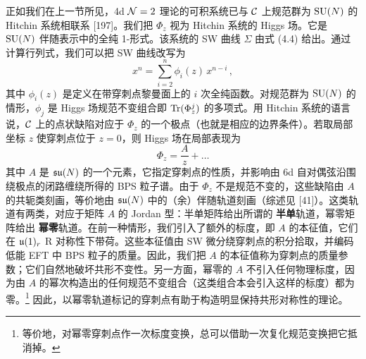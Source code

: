 正如我们在上一节所见，4d $\mathcal{N}=2$ 理论的可积系统已与 $\mathcal{C}$ 上规范群为 $\mathrm{SU}(N)$ 的 Hitchin 系统相联系 [197]。我们把 $\Phi_z$ 视为 Hitchin 系统的 Higgs 场。它是 $\mathrm{SU}(N)$ 伴随表示中的全纯 1-形式。该系统的 SW 曲线 $\Sigma$ 由式 (4.4) 给出。通过计算行列式，我们可以把 SW 曲线改写为
\begin{equation}
  x^n = \sum_{i=2}^{n}\phi_i(z)\,x^{n-i}\,,
  \tag{4.9}
\end{equation}
其中 $\phi_i(z)$ 是定义在带穿刺点黎曼面上的 $i$ 次全纯函数。对规范群为 $\mathrm{SU}(N)$ 的情形，$\phi_j$ 是 Higgs 场规范不变组合即 $\operatorname{Tr}(\Phi_z^j)$ 的多项式。用 Hitchin 系统的语言说，$\mathcal{C}$ 上的点状缺陷对应于 $\Phi_z$ 的一个极点（也就是相应的边界条件）。若取局部坐标 $z$ 使穿刺点位于 $z=0$，则 Higgs 场在局部表现为
\begin{equation}
  \Phi_z = \frac{A}{z} + \ldots
  \tag{4.10}
\end{equation}
其中 $A$ 是 $\mathfrak{su}(N)$ 的一个元素，它指定穿刺点的性质，并影响由 6d 自对偶弦沿围绕极点的闭路缠绕所得的 BPS 粒子谱。由于 $\Phi_z$ 不是规范不变的，这些缺陷由 $A$ 的共轭类刻画，等价地由 $\mathfrak{su}(N)$ 中的（余）伴随轨道刻画（综述见 [41]）。这类轨道有两类，对应于矩阵 $A$ 的 Jordan 型：半单矩阵给出所谓的 \textbf{半单}轨道，幂零矩阵给出 \textbf{幂零}轨道。在前一种情形，我们引入了额外的标度，即 $A$ 的本征值，它们在 $\mathfrak{u}(1)_r$ R 对称性下带荷。这些本征值由 SW 微分绕穿刺点的积分拾取，并编码低能 EFT 中 BPS 粒子的质量。因此，我们把 $A$ 的本征值称为穿刺点的质量参数；它们自然地破坏共形不变性。另一方面，幂零的 $A$ 不引入任何物理标度，因为由 $A$ 的幂次构造出的任何规范不变组合（这类组合本会引入这样的标度）都为零。\footnote{等价地，对幂零穿刺点作一次标度变换，总可以借助一次复化规范变换把它抵消掉。} 因此，以幂零轨道标记的穿刺点有助于构造明显保持共形对称性的理论。


